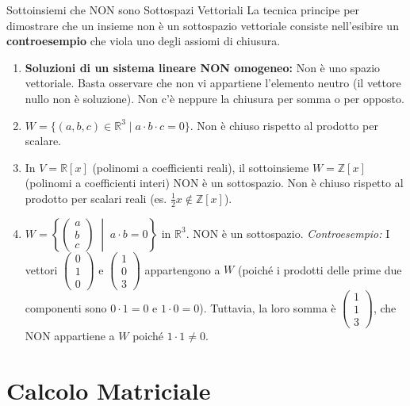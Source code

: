 \documentclass[11pt,a4paper]{article}
\begin{document}
\begin{example}{Sottoinsiemi che NON sono Sottospazi Vettoriali}{}
La tecnica principe per dimostrare che un insieme non è un sottospazio vettoriale consiste nell'esibire un \textbf{controesempio} che viola uno degli assiomi di chiusura.
\begin{enumerate}
    \item \textbf{Soluzioni di un sistema lineare NON omogeneo:} Non è uno spazio vettoriale. Basta osservare che non vi appartiene l'elemento neutro (il vettore nullo non è soluzione). Non c'è neppure la chiusura per somma o per opposto.
    
    \item $W = \{ (a,b,c) \in \mathbb{R}^3 \mid a \cdot b \cdot c = 0 \}$. Non è chiuso rispetto al prodotto per scalare.
    
    \item In $V = \mathbb{R}[x]$ (polinomi a coefficienti reali), il sottoinsieme $W = \mathbb{Z}[x]$ (polinomi a coefficienti interi) NON è un sottospazio. Non è chiuso rispetto al prodotto per scalari reali (es. $\frac{1}{2} x \notin \mathbb{Z}[x]$).
    
    \item $W = \left\{ \begin{pmatrix} a \\ b \\ c \end{pmatrix} \;\middle|\; a \cdot b = 0 \right\}$ in $\mathbb{R}^3$. NON è un sottospazio.
    \textit{Controesempio:} I vettori $\begin{pmatrix} 0 \\ 1 \\ 0 \end{pmatrix}$ e $\begin{pmatrix} 1 \\ 0 \\ 3 \end{pmatrix}$ appartengono a $W$ (poiché i prodotti delle prime due componenti sono $0 \cdot 1 = 0$ e $1 \cdot 0 = 0$). Tuttavia, la loro somma è $\begin{pmatrix} 1 \\ 1 \\ 3 \end{pmatrix}$, che NON appartiene a $W$ poiché $1 \cdot 1 \neq 0$.
\end{enumerate}
\end{example}

\newpage
\section{Calcolo Matriciale}
\end{document}
